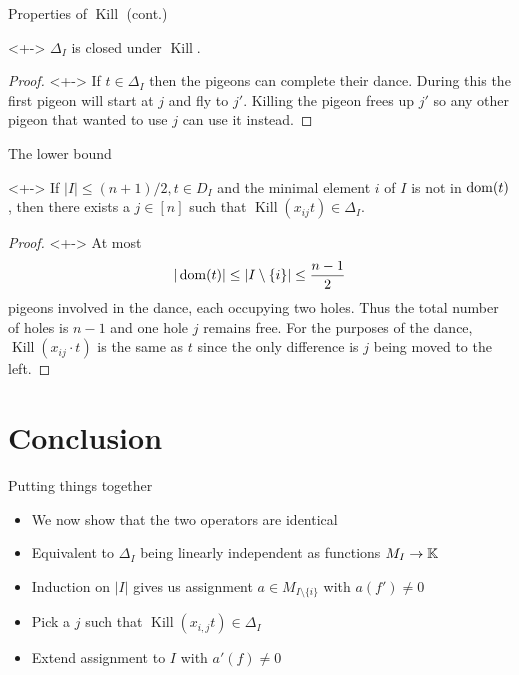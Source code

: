 \documentclass[xcolor={dvipsnames}]{beamer}
\renewcommand{\K}{\operatorname{Kill}}
\begin{document}
\begin{frame}{Properties of $\K$ (cont.)}
     \begin{theorem}<+->
        $\Delta_I$ is closed under $\K$.
     \end{theorem}
    \begin{proof}[Proof\nopunct]<+->
        If $t \in \Delta_I$ then the pigeons can complete their dance. During this the first pigeon will start at $j$ and fly to $j'$. Killing the pigeon frees up $j'$ so any other pigeon that wanted to use $j$ can use it instead.
    \end{proof}
\end{frame}

\begin{frame}{The lower bound}
    \begin{theorem}<+->
        If $|I| \leq (n+1) / 2, t \in D_I$ and the minimal element $i$ of $I$ is not in $\operatorname{dom}(t)$, then there exists a $j \in [n]$ such that $\K(x_{ij} t) \in \Delta_I$.
    \end{theorem}
    \begin{proof}[Proof\nopunct{}]<+->
        At most $$
            |\operatorname{dom}(t)| \leq |I \setminus \{i\}| \leq \frac{n - 1}{2}
        $$ pigeons involved in the dance, each occupying two holes. Thus the total number of holes is $n - 1$ and one hole $j$ remains free. For the purposes of the dance, $\K(x_{ij} \cdot t)$ is the same as $t$ since the only difference is $j$ being moved to the left.
    \end{proof}
\end{frame}

\section{Conclusion}

\begin{frame}{Putting things together}
    \begin{itemize}[<+->]
        \item We now show that the two operators are identical
        \item Equivalent to $\Delta_I$ being linearly independent as functions $M_I \to \mathbb{K}$
        \item Induction on $|I|$ gives us assignment $a \in M_{I\setminus \{i\}}$ with $a(f') \neq 0$
        \item Pick a $j$ such that $\K(x_{i, j} t) \in \Delta_I$
        \item Extend assignment to $I$ with $a'(f) \neq 0$
    \end{itemize}
\end{frame}
\end{document}
